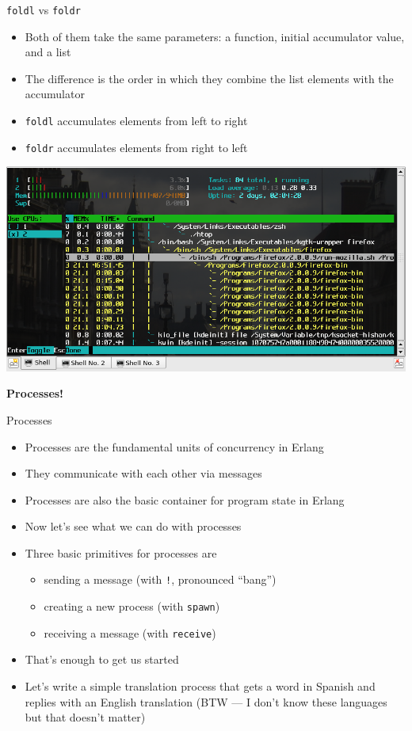 \documentclass[12pt,xcolor=svgnames]{beamer}
\begin{document}
\begin{frame}{\texttt{foldl} vs \texttt{foldr}}
\begin{itemize}
\item Both of them take the same parameters: a function, initial accumulator value, and a list
\item The difference is the order in which they combine the list elements with the accumulator
\item \texttt{foldl} accumulates elements from left to right
\item \texttt{foldr} accumulates elements from right to left
\end{itemize}
\end{frame}

\begin{frame}
\centerline{\includegraphics[width=\textwidth]{images/processes.png}}
\centerline{\Huge\textbf{Processes!}}
\end{frame}

\begin{frame}{Processes}
\begin{itemize}
\item Processes are the fundamental units of concurrency in Erlang
\item They communicate with each other via messages
\item Processes are also the basic container for program state in Erlang
\item Now let's see what we can do with processes
\end{itemize}

\framebreak

\begin{itemize}
\item Three basic primitives for processes are
\begin{itemize}
\item sending a message (with \texttt{!}, pronounced ``bang'')
\item creating a new process (with \texttt{spawn})
\item receiving a message (with \texttt{receive})
\end{itemize}
\item That's enough to get us started
\item Let's write a simple translation process that gets a word in Spanish and replies with an English translation
(BTW --- I don't know these languages but that doesn't matter)
\end{itemize}
\end{frame}
\end{document}
